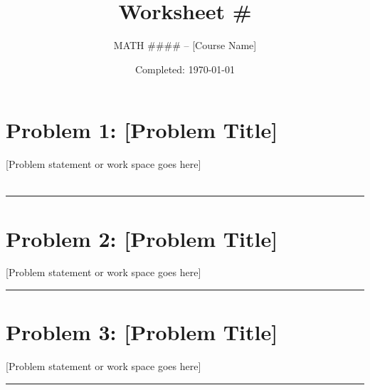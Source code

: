 \documentclass{article}
\title{Worksheet \#}
\author{
  MATH #### -- [Course Name]\\
  \myauthor
}
\date{Completed: \today}
\begin{document}
\maketitle %


\section*{Problem 1: [Problem Title]}
[Problem statement or work space goes here]

\begin{align*}
\end{align*}

\vspace{1cm} %

\hrule %

\newpage
\section*{Problem 2: [Problem Title]}
[Problem statement or work space goes here]

\vspace{1cm} %

\hrule

\newpage
\section*{Problem 3: [Problem Title]}
[Problem statement or work space goes here]

\vspace{1cm} %

\hrule

\end{document}
